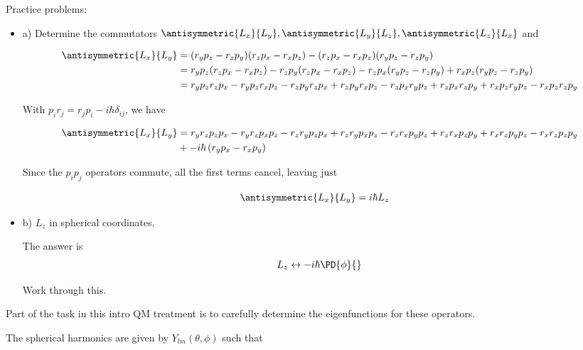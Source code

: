 Practice problems:
\begin{itemize}
\item a) Determine the commutators $\antisymmetric{L_x}{L_y}, \antisymmetric{L_y}{L_z}, \antisymmetric{L_z}{L_x}$ and

\begin{align*}
\antisymmetric{L_x}{L_y}
&=
(r_y p_z -r_z p_y)
(r_z p_x -r_x p_z)
-
(r_z p_x -r_x p_z)
(r_y p_z -r_z p_y) \\
&=
r_y p_z (r_z p_x -r_x p_z)
-r_z p_y (r_z p_x -r_x p_z)
- r_z p_x (r_y p_z -r_z p_y)
+ r_x p_z (r_y p_z -r_z p_y) \\
&=
r_y p_z r_z p_x
-r_y p_z r_x p_z
-r_z p_y r_z p_x
+r_z p_y r_x p_z
- r_z p_x r_y p_z
+ r_z p_x r_z p_y
+ r_x p_z r_y p_z
- r_x p_z r_z p_y \\
\end{align*}

With $p_i r_j = r_j p_i - i \hbar \delta_{ij}$, we have

\begin{align*}
\antisymmetric{L_x}{L_y}
&=
r_y r_z p_z p_x
-r_y r_z p_x p_z
-r_z r_y p_z p_x
+r_z r_y p_x p_z
- r_z r_x p_y p_z
+ r_z r_x p_z p_y
+ r_x r_z p_y p_z
- r_x r_z p_z p_y \\
&+
-i \hbar
\left(
r_y p_x
- r_x p_y
\right)
\end{align*}

Since the $p_i p_j$ operators commute, all the first terms cancel, leaving just

\begin{align*}
\antisymmetric{L_x}{L_y}
&=i \hbar L_z
\end{align*}


\item b) $L_z$ in spherical coordinates.

The answer is
\begin{align}\label{eqn:PHY356Foct19:1003}
L_z \leftrightarrow -i \hbar \PD{\phi}{}
\end{align}

Work through this.
\end{itemize}

Part of the task in this intro QM treatment is to carefully determine the eigenfunctions for these operators.

The spherical harmonics are given by $Y_{lm}(\theta, \phi)$ such that

